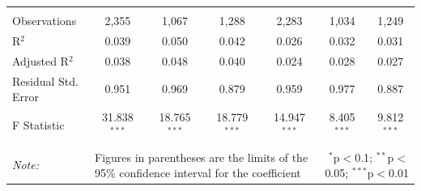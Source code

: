 \documentclass[alpha-refs]{wiley-article-01g}
\begin{document}
\begin{landscape}
\begin{table}[!htbp]
\begin{tabular}{@{\extracolsep{5pt}}lcccccc}
    & & & & & & \\ 
  \hline \\[-3ex] 
Observations & 2,355 & 1,067 & 1,288 & 2,283 & 1,034 & 1,249 \\ 
R$^{2}$ & 0.039 & 0.050 & 0.042 & 0.026 & 0.032 & 0.031 \\ 
Adjusted R$^{2}$ & 0.038 & 0.048 & 0.040 & 0.024 & 0.028 & 0.027 \\ 
Residual Std. Error & 0.951 & 0.969 & 0.879 & 0.959 & 0.977 & 0.887 \\ 
F Statistic & 31.838$^{***}$ & 18.765$^{***}$ & 18.779$^{***}$ & 14.947$^{***}$ & 8.405$^{***}$ & 9.812$^{***}$ \\ 
\hline 
\hline \\[-3ex] 
\textit{Note:} &\multicolumn{4}{l}{Figures in parentheses are the limits of the 95\% confidence interval for the coefficient}  & \multicolumn{2}{r}{$^{*}$p$<$0.1; $^{**}$p$<$0.05; $^{***}$p$<$0.01} \\ 
\end{tabular} 
\end{table} 

\end{landscape}

\newpage
\end{document}
